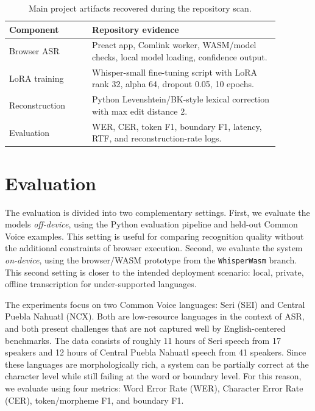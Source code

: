 \documentclass[11pt]{article}
\begin{document}
\begin{table}[t]
\centering
\small
\begin{tabular}{p{0.27\linewidth}p{0.61\linewidth}}
\toprule
Component & Repository evidence\\
\midrule
Browser ASR & Preact app, Comlink worker, WASM/model checks, local model loading, confidence output.\\
LoRA training & Whisper-small fine-tuning script with LoRA rank 32, alpha 64, dropout 0.05, 10 epochs.\\
Reconstruction & Python Levenshtein/BK-style lexical correction with max edit distance 2.\\
Evaluation & WER, CER, token F1, boundary F1, latency, RTF, and reconstruction-rate logs.\\
\bottomrule
\end{tabular}
\caption{Main project artifacts recovered during the repository scan.}
\label{tab:artifacts}
\end{table}

\section{Evaluation}
\label{sec:evaluation}

The evaluation is divided into two complementary settings. First, we evaluate the models \emph{off-device}, using the Python evaluation pipeline and held-out Common Voice examples. This setting is useful for comparing recognition quality without the additional constraints of browser execution. Second, we evaluate the system \emph{on-device}, using the browser/WASM prototype from the \texttt{WhisperWasm} branch. This second setting is closer to the intended deployment scenario: local, private, offline transcription for under-supported languages.

The experiments focus on two Common Voice languages: Seri (SEI) and Central Puebla Nahuatl (NCX). Both are low-resource languages in the context of ASR, and both present challenges that are not captured well by English-centered benchmarks. The data consists of roughly 11 hours of Seri speech from 17 speakers and 12 hours of Central Puebla Nahuatl speech from 41 speakers. Since these languages are morphologically rich, a system can be partially correct at the character level while still failing at the word or boundary level. For this reason, we evaluate using four metrics: Word Error Rate (WER), Character Error Rate (CER), token/morpheme F1, and boundary F1.
\end{document}
